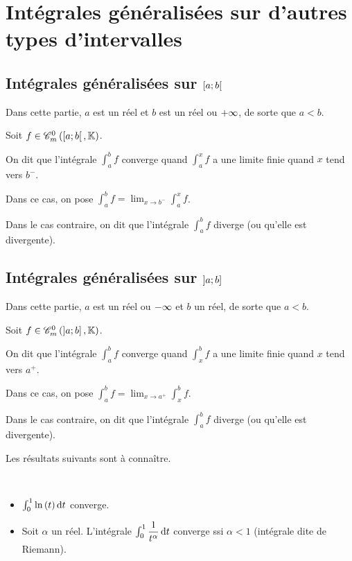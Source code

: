 \section{Intégrales généralisées sur d'autres types d'intervalles}

\subsection{Intégrales généralisées sur \(\left[a;b\right[\)}

Dans cette partie, \(a\) est un réel et \(b\) est un réel ou \(+\infty\), de sorte que \(a<b\).

\begin{defi}
Soit \(f\in\contm[\intervie{a}{b}]\).

On dit que l'intégrale \(\int_a^bf\) converge quand \(\int_a^xf\) a une limite finie quand \(x\) tend vers \(b^-\).

Dans ce cas, on pose \(\int_a^bf=\lim_{x\to b^-}\int_a^xf\).

Dans le cas contraire, on dit que l'intégrale \(\int_a^bf\) diverge (ou qu'elle est divergente).
\end{defi}

\subsection{Intégrales généralisées sur \(\left]a;b\right]\)}

Dans cette partie, \(a\) est un réel ou \(-\infty\) et \(b\) un réel, de sorte que \(a<b\).

\begin{defi}
Soit \(f\in\contm[\intervei{a}{b}]\).

On dit que l'intégrale \(\int_a^bf\) converge quand \(\int_x^bf\) a une limite finie quand \(x\) tend vers \(a^+\).

Dans ce cas, on pose \(\int_a^bf=\lim_{x\to a^+}\int_x^bf\).

Dans le cas contraire, on dit que l'intégrale \(\int_a^bf\) diverge (ou qu'elle est divergente).
\end{defi}

Les résultats suivants sont à connaître.

\begin{ex}~\\
\begin{itemize}
    \item \(\int_0^1\ln\paren{t}\odif{t}\) converge. \\
    \item Soit \(\alpha\) un réel. L'intégrale \(\int_0^1\dfrac{1}{t^\alpha}\odif{t}\) converge ssi \(\alpha<1\) (intégrale dite de Riemann).
\end{itemize}
\end{ex}

